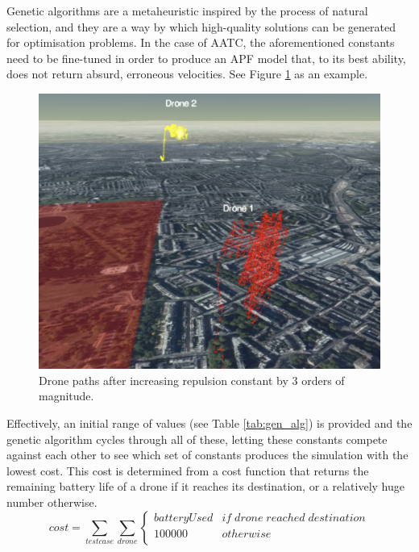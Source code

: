 \documentclass[a4paper,11pt,titlepage]{report}
\begin{document}
Genetic algorithms are a metaheuristic inspired by the process of natural selection, and they are a way by which high-quality solutions can be generated for optimisation problems\cite{Mitchell1996}. In the case of AATC, the aforementioned constants need to be fine-tuned in order to produce an APF model that, to its best ability, does not return absurd, erroneous velocities. See Figure \ref{fig:aatc_spaghett} as an example. \\

\begin{figure}[!hbpt]
  \center
  \includegraphics[width=\linewidth]{img/aatc_spaghett.jpg}
  \caption{Drone paths after increasing repulsion constant by 3 orders of magnitude.}
  \label{fig:aatc_spaghett}
\end{figure}

\newpage
Effectively, an initial range of values (see Table \ref{tab:gen_alg}) is provided and the genetic algorithm cycles through all of these, letting these constants compete against each other to see which set of constants produces the simulation with the lowest cost. This cost is determined from a cost function that returns the remaining battery life of a drone if it reaches its destination, or a relatively huge number otherwise.
$$cost = \sum_{testcase} \sum_{drone}
    \begin{cases}
      batteryUsed & if \; drone \; reached \; destination    \\
      100000 & otherwise \\

   \end{cases}$$
\end{document}
